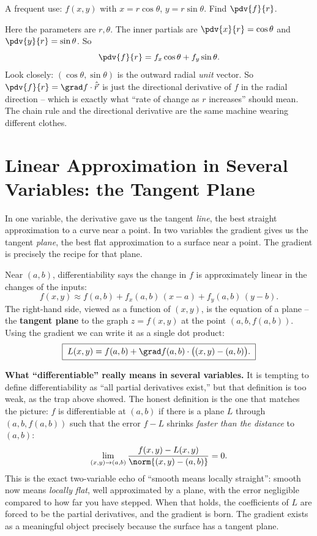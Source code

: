 \begin{example}
\label{ch33:ex-polar}
A frequent use: $f(x,y)$ with $x=r\cos\theta$, $y=r\sin\theta$. Find
$\pdv{f}{r}$.

Here the parameters are $r,\theta$. The inner partials are
$\pdv{x}{r}=\cos\theta$ and $\pdv{y}{r}=\sin\theta$. So
\[
  \pdv{f}{r} = f_x\cos\theta + f_y\sin\theta.
\]
Look closely: $(\cos\theta,\sin\theta)$ is the outward radial \emph{unit} vector.
So $\pdv{f}{r} = \grad f \cdot \hat{\vec r}$ is just the directional derivative of
$f$ in the radial direction -- which is exactly what ``rate of change as $r$
increases'' should mean. The chain rule and the directional derivative are the
same machine wearing different clothes.
\end{example}

\section{Linear Approximation in Several Variables: the Tangent Plane}
\label{ch33:tangentplane}

In one variable, the derivative gave us the tangent \emph{line}, the best straight
approximation to a curve near a point. In two variables the gradient gives us the
tangent \emph{plane}, the best flat approximation to a surface near a point. The
gradient is precisely the recipe for that plane.

Near $(a,b)$, differentiability says the change in $f$ is approximately linear in
the changes of the inputs:
\[
  f(x,y) \approx f(a,b) + f_x(a,b)\,(x-a) + f_y(a,b)\,(y-b).
\]
The right-hand side, viewed as a function of $(x,y)$, is the equation of a plane --
the \textbf{tangent plane} to the graph $z=f(x,y)$ at the point $(a,b,f(a,b))$.
Using the gradient we can write it as a single dot product:
\[
  \boxed{\;L(x,y) = f(a,b) + \grad f(a,b)\cdot\big((x,y)-(a,b)\big).\;}
\]

\begin{happeningbox}
\textbf{What ``differentiable'' really means in several variables.} It is tempting
to define differentiability as ``all partial derivatives exist,'' but that
definition is too weak, as the trap above showed. The honest definition is the one
that matches the picture: $f$ is differentiable at $(a,b)$ if there is a plane $L$
through $(a,b,f(a,b))$ such that the error $f-L$ shrinks \emph{faster than the
distance} to $(a,b)$:
\[
  \lim_{(x,y)\to(a,b)}\frac{f(x,y)-L(x,y)}{\norm{(x,y)-(a,b)}} = 0.
\]
This is the exact two-variable echo of ``smooth means locally straight'': smooth
now means \emph{locally flat}, well approximated by a plane, with the error
negligible compared to how far you have stepped. When that holds, the coefficients
of $L$ are forced to be the partial derivatives, and the gradient is born. The
gradient exists as a meaningful object precisely because the surface has a
tangent plane.
\end{happeningbox}

